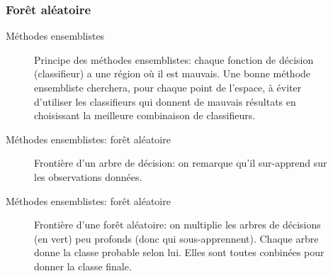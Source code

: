 \documentclass[8pt]{beamer}
\begin{document}
			\subsubsection{Forêt aléatoire}
				\begin{frame}{Méthodes ensemblistes}
					\begin{figure}[H]
						
						\caption*{Principe des méthodes ensemblistes: chaque fonction de décision (classifieur) a une région où il est mauvais. Une bonne méthode ensembliste cherchera, pour chaque point de l'espace, à éviter d'utiliser les classifieurs qui donnent de mauvais résultats en choisissant la meilleure combinaison de classifieurs.}
					\end{figure}
				\end{frame}
				\begin{frame}{Méthodes ensemblistes: forêt aléatoire}
					\begin{figure}[H]
						
						\caption*{Frontière d'un arbre de décision: on remarque qu'il sur-apprend sur les observations données.}
					\end{figure}
				\end{frame}
				\begin{frame}{Méthodes ensemblistes: forêt aléatoire}
					\begin{figure}[H]
						
						\caption*{Frontière d'une forêt aléatoire: on multiplie les arbres de décisions (en vert) peu profonds (donc qui sous-apprennent). Chaque arbre donne la classe probable selon lui. Elles sont toutes conbinées pour donner la classe finale.}
					\end{figure}
				\end{frame}
\end{document}
